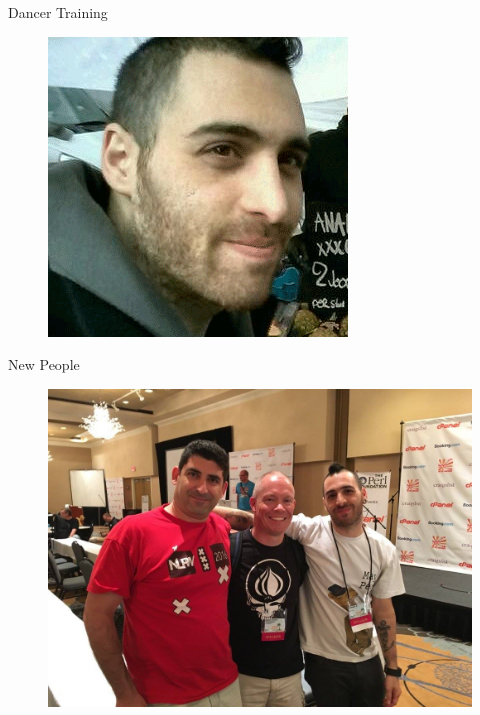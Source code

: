 \begin{frame}{Dancer Training}
\begin{figure}[!ht]
\centering
\includegraphics[width=1\linewidth]{img/sawyer.png}
\end{figure}
\end{frame}

\begin{frame}{New People}
\begin{figure}[!ht]
\centering
\includegraphics[width=1\linewidth]{img/crowd.png}
\end{figure}
\end{frame}
